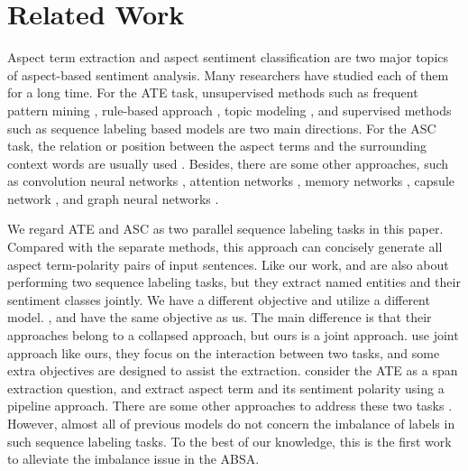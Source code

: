 \documentclass[11pt,a4paper]{article}
\begin{document}
\section{Related Work}
\label{sec_related_work}
Aspect term extraction and aspect sentiment classification are two major topics of aspect-based sentiment analysis. Many researchers have studied each of them for a long time. For the ATE task, unsupervised methods such as frequent pattern mining \cite{Hu2004}, rule-based approach \cite{Qiu2011, Liu2015Automated}, topic modeling \cite{He2011auto, Chen2014Aspect}, and supervised methods such as sequence labeling based models \cite{Wang2016a,Yin2016,Xu2018,Li2018a,Luo2019a,Ma2019} are two main directions. For the ASC task, the relation or position between the aspect terms and the surrounding context words are usually used \cite{Tang2016a,Arjun2016extract}. Besides, there are some other approaches, such as convolution neural networks \cite{Poria2016aspect,Li2018}, attention networks \cite{Wang2016attention,Ma2017a,He2017}, memory networks \cite{Wang2018a}, capsule network \cite{Chen2019}, and graph neural networks \cite{Wang2020}.

We regard ATE and ASC as two parallel sequence labeling tasks in this paper. Compared with the separate methods, this approach can concisely generate all aspect term-polarity pairs of input sentences. Like our work, \citet{Mitchell2013} and \citet{Zhang2015} are also about performing two sequence labeling tasks, but they extract named entities and their sentiment classes jointly. We have a different objective and utilize a different model. \citet{Li2017}, \citet{ma-etal-2018-joint} and \citet{Li2019a} have the same objective as us. The main difference is that their approaches belong to a collapsed approach, but ours is a joint approach. \citet{Luo2019} use joint approach like ours, they focus on the interaction between two tasks, and some extra objectives are designed to assist the extraction. \citet{Hu2019} consider the ATE as a span extraction question, and extract aspect term and its sentiment polarity using a pipeline approach. There are some other approaches to address these two tasks \cite{Li2019b,He2019,Liang2020a,Peng2020,Wan2020,Liang2020,Liu2020,chen2020racl}. However, almost all of previous models do not concern the imbalance of labels in such sequence labeling tasks. To the best of our knowledge, this is the first work to alleviate the imbalance issue in the ABSA.
\end{document}
